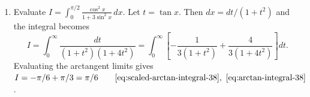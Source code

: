 \begin{enumerate}[leftmargin=4mm,itemsep=9pt]
\[\[\[\[\item A trust receives Rs. 30,000 per month. Half is spent on care, and 2\% of the amount spent is collected from beneficiaries. The unspent balance is deposited in a bank. Find the monthly interest rate needed for total monthly income of Rs. 1800.
\solution Let $u$ be the monthly contribution collected from beneficiaries and $v$ the bank interest. Half of Rs. $30,000$ is spent, so
\[
u=0.02(15000)=300.
\]
The total monthly income is Rs. $1800$, so
\[
u+v=1800,\qquad u=300.
\]
Write this system as an augmented matrix:
\[
\left[\begin{array}{cc|c}1&1&1800\\1&0&300\end{array}\right]
\xrightarrow{R_2\leftarrow R_2-R_1}
\left[\begin{array}{cc|c}1&1&1800\\0&-1&-1500\end{array}\right]
\xrightarrow{R_2\leftarrow -R_2}
\left[\begin{array}{cc|c}1&1&1800\\0&1&1500\end{array}\right].
\]
Eliminate $v$ from the first row:
\[
R_1\leftarrow R_1-R_2:\qquad
\left[\begin{array}{cc|c}1&0&300\\0&1&1500\end{array}\right]\qquad\eqref{eq:gaussian-elimination}.
\]
Thus $u=300$ and $v=1500$. The deposit is Rs. $15000$, therefore
\[
r=\frac{1500}{15000}\times100\%=10\%\text{ per month}.
\]
\par\smallskip
\noindent\textbf{Code reference -}
\par\noindent{}
\par\smallskip

\paragraph*{Integration and area}
\item Evaluate $\displaystyle I=\int_0^{\pi/2}\frac{\cos^2x}{1+3\sin^2x}\,dx$.
\solution Let $t=\tan x$. Then $dx=dt/(1+t^2)$ and the integral becomes
\[
I=\int_0^\infty\frac{dt}{(1+t^2)(1+4t^2)}=\int_0^\infty\left[-\frac1{3(1+t^2)}+\frac4{3(1+4t^2)}\right]dt.
\]
Evaluating the arctangent limits gives $I=-\pi/6+\pi/3=\pi/6\qquad\eqref{eq:scaled-arctan-integral-38},\ \eqref{eq:arctan-integral-38}$.

\]\]\]\]
\end{enumerate}
